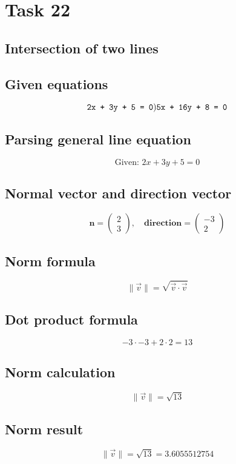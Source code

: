 \documentclass{article}
\begin{document}
\section*{Task 22}

\subsection*{Intersection of two lines}
\subsection*{ \vspace{1em} Given equations}
\[
\texttt{2x + 3y + 5 = 0}) \\ \texttt{5x + 16y + 8 = 0}
\]
\subsection*{ \vspace{1em} Parsing general line equation}
\[
\text{Given: } 2x + 3y + 5 = 0
\]
\subsection*{ \vspace{1em} Normal vector and direction vector}
\[
\mathbf{n} = \begin{pmatrix}2 \\ 3\end{pmatrix}, \quad
           \mathbf{direction} = \begin{pmatrix}-3 \\ 2\end{pmatrix}
\]
\subsection*{ \vspace{1em} Norm formula}
\[
\|\vec{v}\| = \sqrt{\vec{v} \cdot \vec{v}}
\]
\subsection*{ \vspace{1em} Dot product formula}
\[
-3 \cdot -3 + 2 \cdot 2 = 13
\]
\subsection*{ \vspace{1em} Norm calculation}
\[
\|\vec{v}\| = \sqrt{13}
\]
\subsection*{ \vspace{1em} Norm result}
\[
\|\vec{v}\| = \sqrt{13} = 3.6055512754
\]
\end{document}
